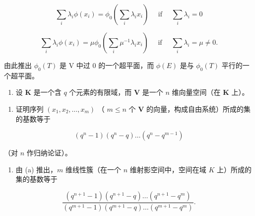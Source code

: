 \[
\sum_ {i} \lambda_ {i} \phi (x _ {i}) = \phi_ {0} \left(\sum_ {i} \lambda_ {i} x _ {i}\right) \quad \text { if } \quad \sum_ {i} \lambda_ {i} = 0
\]

\[
\sum_ {i} \lambda_ {i} \phi (x _ {i}) = \mu \phi_ {0} \left(\sum_ {i} \mu^ {- 1} \lambda_ {i} x _ {i}\right) \quad \text { if } \quad \sum_ {i} \lambda_ {i} = \mu \neq 0.
\]

由此推出 \(\phi_{0}(T)\) 是 V 中过 0 的一个超平面，而 \(\phi(E)\) 是与 \(\phi_{0}(T)\) 平行的一个超平面。

\begin{enumerate}
\def\labelenumi{\arabic{enumi}.}
\setcounter{enumi}{8}
\tightlist
\item
  设 \(\mathbf{K}\) 是一个含 \(q\) 个元素的有限域，而 \(\mathbf{V}\) 是一个 \(n\) 维向量空间（在 \(\mathbf{K}\) 上）。
\end{enumerate}

\begin{enumerate}
\def\labelenumi{(\alph{enumi})}
\tightlist
\item
  证明序列 \((x_{1}, x_{2}, \ldots, x_{m})\) （ \(m \leqslant n\) 个 \(\mathbf{V}\) 的向量，构成自由系统）所成的集的基数等于
\end{enumerate}

\[
(q ^ {n} - 1) (q ^ {n} - q) \dots (q ^ {n} - q ^ {m - 1})
\]

（对 \(n\) 作归纳论证）。

\begin{enumerate}
\def\labelenumi{(\alph{enumi})}
\setcounter{enumi}{1}
\tightlist
\item
  由 (a) 推出，\(m\) 维线性簇（在一个 \(n\) 维射影空间中，空间在域 \(K\) 上）所成的集的基数等于
\end{enumerate}

\[
\frac {(q ^ {n + 1} - 1) (q ^ {n + 1} - q) \dots (q ^ {n + 1} - q ^ {m})}{(q ^ {m + 1} - 1) (q ^ {m + 1} - q) \dots (q ^ {m + 1} - q ^ {m})}.
\]

